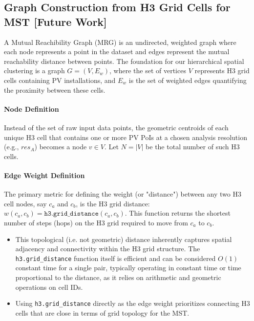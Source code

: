 \subsection{Graph Construction from H3 Grid Cells for MST [Future Work]}

A Mutual Reachibility Graph (MRG) is an undirected, weighted graph where each node represents a point in the dataset and edges represent the mutual reachability distance between points.
The foundation for our hierarchical spatial clustering is a graph $G=(V, E_w)$, where the set of vertices $V$ represents H3 grid cells containing PV installations, and $E_w$ is the set of weighted edges quantifying the proximity between these cells.

\paragraph{Node Definition}
Instead of the set of raw input data points, the geometric centroids of each unique H3 cell that contains one or more PV PoIs at a chosen analysis resolution (e.g., $res_A$) becomes a node $v \in V$. Let $N = |V|$ be the total number of such H3 cells.

\paragraph{Edge Weight Definition}
The primary metric for defining the weight (or "distance") between any two H3 cell nodes, say $c_a$ and $c_b$, is the H3 grid distance: $w(c_a, c_b) = \texttt{h3.grid\_distance}(c_a, c_b)$. 
This function returns the shortest number of steps (hops) on the H3 grid required to move from $c_a$ to $c_b$.
\begin{itemize}
    \item This topological (i.e. not geometric) distance inherently captures spatial adjacency and connectivity within the H3 grid structure. 
    The \texttt{h3.grid\_distance} function itself is efficient and can be considered $O(1)$ constant time for a single pair\cite{H3_Algorithm1}, typically operating in constant time or time proportional to the distance, as it relies on arithmetic and geometric operations on cell IDs.
    \item Using \texttt{h3.grid\_distance} directly as the edge weight prioritizes connecting H3 cells that are close in terms of grid topology for the MST.
\end{itemize}


